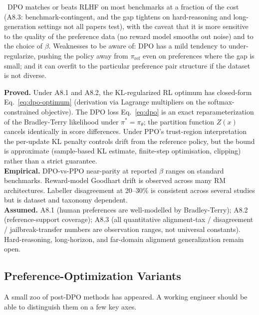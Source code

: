\Emp\ DPO matches or beats RLHF on most benchmarks at a fraction of
the cost (A8.3: benchmark-contingent, and the gap tightens on
hard-reasoning and long-generation settings not all papers test),
with the caveat that it is more sensitive to the quality of the
preference data (no reward model smooths out noise) and to the
choice of $\beta$. Weaknesses to be aware of: DPO has a mild
tendency to under-regularize, pushing the policy away from
$\pi_\text{ref}$ even on preferences where the gap is small; and it
can overfit to the particular preference pair structure if the
dataset is not diverse.

\begin{provedassumed}
\textbf{Proved.} Under A8.1 and A8.2, the KL-regularized RL optimum
has closed-form Eq.~\eqref{eq:dpo-optimum} (derivation via Lagrange
multipliers on the softmax-constrained objective). The DPO loss
Eq.~\eqref{eq:dpo} is an exact reparameterization of the
Bradley-Terry likelihood under $\pi^* = \pi_\theta$; the partition
function $Z(x)$ cancels identically in score differences. Under
PPO's trust-region interpretation the per-update KL penalty
controls drift from the reference policy, but the bound is
approximate (sample-based KL estimate, finite-step optimisation,
clipping) rather than a strict guarantee.\\
\textbf{Empirical.} DPO-vs-PPO near-parity
\citep{rafailov2023direct} at reported $\beta$ ranges on standard
benchmarks. Reward-model Goodhart drift \citep{gao2023scaling} is
observed across many RM architectures. Labeller disagreement at
20--30\% is consistent across several studies but is dataset and
taxonomy dependent.\\
\textbf{Assumed.} A8.1 (human preferences are well-modelled by
Bradley-Terry); A8.2 (reference-support coverage); A8.3 (all
quantitative alignment-tax / disagreement / jailbreak-transfer
numbers are observation ranges, not universal constants).
Hard-reasoning, long-horizon, and far-domain alignment
generalization remain open.
\end{provedassumed}

\subsection{Preference-Optimization Variants}

A small zoo of post-DPO methods has appeared. A working engineer
should be able to distinguish them on a few key axes.

